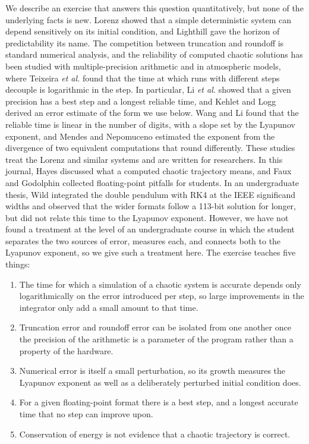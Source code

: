 \documentclass[prb,reprint,amsmath,amssymb,longbibliography]{revtex4-1}
\begin{document}
We describe an exercise that answers this question quantitatively, but none of
the underlying facts is new. Lorenz\cite{lorenz1963} showed that a simple
deterministic system can depend sensitively on its initial condition, and
Lighthill\cite{lighthill1986} gave the horizon of predictability its name. The
competition between truncation and roundoff is standard numerical
analysis,\cite{hairer1993} and the reliability of computed chaotic solutions has
been studied with multiple-precision arithmetic\cite{liao2009} and in
atmospheric models, where Teixeira \textit{et al.}\cite{teixeira2007} found that
the time at which runs with different steps decouple is logarithmic in the
step. In particular, Li \textit{et al.}\cite{li2001} showed that a given
precision has a best step and a longest reliable time, and Kehlet and
Logg\cite{kehlet2017} derived an error estimate of the form we use below. Wang
and Li\cite{wang2014} found that the reliable time is linear in the number of
digits, with a slope set by the Lyapunov exponent, and Mendes and
Nepomuceno\cite{mendes2016} estimated the exponent from the divergence of two
equivalent computations that round differently. These studies treat the Lorenz
and similar systems and are written for researchers. In this journal,
Hayes\cite{hayes2004} discussed what a computed chaotic trajectory means, and
Faux and Godolphin\cite{faux2021} collected floating-point pitfalls for
students. In an undergraduate thesis, Wild\cite{wild2019} integrated the double
pendulum with RK4 at the IEEE significand widths and observed that the wider
formats follow a 113-bit solution for longer, but did not relate this time to
the Lyapunov exponent. However, we have not found a treatment at the level of
an undergraduate course in which the student separates the two sources of
error, measures each, and connects both to the Lyapunov exponent, so we give
such a treatment here.
\ifdefined\longversion
The exercise teaches five things:
\begin{enumerate}
\item The time for which a simulation of a chaotic system is accurate depends
only logarithmically on the error introduced per step, so large improvements in
the integrator only add a small amount to that time.
\item Truncation error and roundoff error can be isolated from one another once
the precision of the arithmetic is a parameter of the program rather than a
property of the hardware.
\item Numerical error is itself a small perturbation, so its growth measures the
Lyapunov exponent as well as a deliberately perturbed initial condition does.
\item For a given floating-point format there is a best step, and a longest
accurate time that no step can improve upon.
\item Conservation of energy is not evidence that a chaotic trajectory is
correct.
\end{enumerate}
\else
\end{document}
